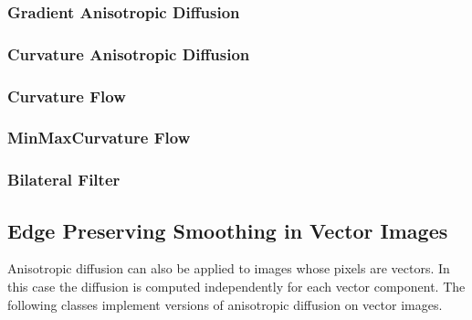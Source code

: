\subsubsection{Gradient Anisotropic Diffusion}
\label{sec:GradientAnisotropicDiffusionImageFilter}

\ifitkFullVersion

\fi



\subsubsection{Curvature Anisotropic Diffusion}
\label{sec:CurvatureAnisotropicDiffusionImageFilter}

\ifitkFullVersion

\fi

\subsubsection{Curvature Flow}
\label{sec:CurvatureFlowImageFilter}

\ifitkFullVersion

\fi

\subsubsection{MinMaxCurvature Flow}
\label{sec:MinMaxCurvatureFlowImageFilter}

\ifitkFullVersion

\fi


\subsubsection{Bilateral Filter}
\label{sec:BilateralImageFilter}

\ifitkFullVersion

\fi



\subsection{Edge Preserving Smoothing in Vector Images}
\label{sec:VectorAnisotropicDiffusion}

Anisotropic diffusion can also be applied to images whose pixels are vectors.
In this case the diffusion is computed independently for each vector
component.  The following classes implement versions of anisotropic diffusion
on vector images.

